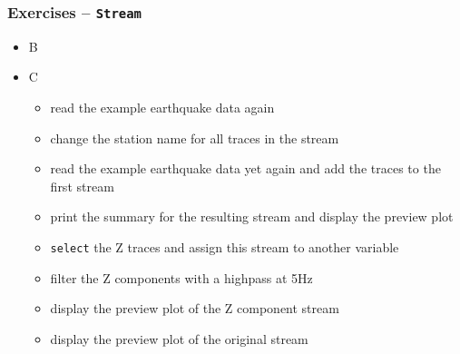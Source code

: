 \documentclass[t,10pt,compress=false,usepdftitle=false]{beamer}
\begin{document}
\begin{frame}[fragile]
    \frametitle{Exercises -- \tt{Stream}}
    \begin{itemize}
    \item B
    \end{itemize}
    \begin{itemize}
    \item C
        \begin{itemize}
        \item read the example earthquake data again
        \item change the station name for all traces in the stream
        \item read the example earthquake data yet again and add the traces to the first stream
        \item print the summary for the resulting stream and display the preview plot
        \item \verb#select# the Z traces and assign this stream to another variable
        \item filter the Z components with a highpass at 5Hz
        \item display the preview plot of the Z component stream
        \item display the preview plot of the original stream
        \end{itemize}
    \end{itemize}
\end{frame}

\end{document}
